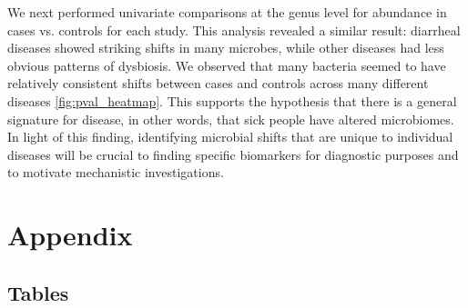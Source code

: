 \documentclass[12pt]{article}
\begin{document}
We next performed univariate comparisons at the genus level for abundance in cases 
vs. controls for each study. This analysis revealed a similar result: diarrheal 
diseases showed striking shifts in many microbes, while other
diseases had less obvious patterns of dysbiosis. We observed that many bacteria
seemed to have relatively consistent shifts between cases and controls across many
different diseases \ref{fig:pval_heatmap}. This supports the hypothesis that
there is a general signature for disease, in other words, that sick people have 
altered microbiomes. In light of this finding, identifying microbial shifts that 
are unique to individual diseases will be crucial to finding specific biomarkers
for diagnostic purposes and to motivate mechanistic investigations.

\newpage
\section{Appendix}
\subsection{Tables}\label{sec:appendix_tables}
\end{document}
